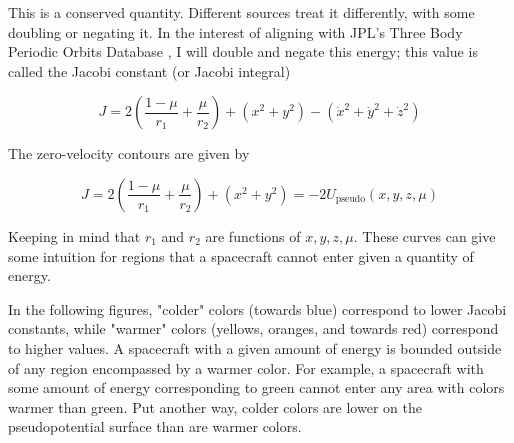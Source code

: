 \documentclass{article}
\begin{document}
This is a conserved quantity. Different sources treat it differently, with some doubling or negating it. In the interest of aligning with JPL's Three Body Periodic Orbits Database \cite{jpl_three_body}, I will double and negate this energy; this value is called the Jacobi constant (or Jacobi integral)

\[\boxed{J=2\left(\frac{1-\mu}{r_1}+\frac{\mu}{r_2}\right)+\left(x^2+y^2\right)-\left(\dot{x}^2+\dot{y}^2+\dot{z}^2\right)}\]

The zero-velocity contours are given by

\[J=2\left(\frac{1-\mu}{r_1}+\frac{\mu}{r_2}\right)+\left(x^2+y^2\right)=-2U_\text{pseudo}(x,y,z,\mu)\]

Keeping in mind that $r_1$ and $r_2$ are functions of $x, y, z, \mu$. These curves can give some intuition for regions that a spacecraft cannot enter given a quantity of energy.

In the following figures, "colder" colors (towards blue) correspond to lower Jacobi constants, while "warmer" colors (yellows, oranges, and towards red) correspond to higher values. A spacecraft with a given amount of energy is bounded outside of any region encompassed by a warmer color. For example, a spacecraft with some amount of energy corresponding to green cannot enter any area with colors warmer than green. Put another way, colder colors are lower on the pseudopotential surface than are warmer colors. 
\end{document}
